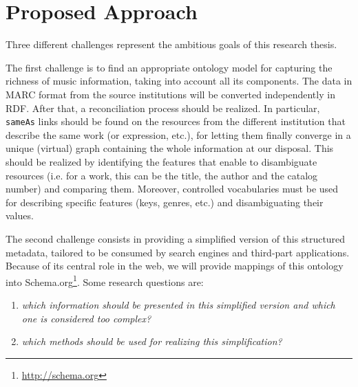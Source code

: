 \documentclass{llncs}
\begin{document}
\section{Proposed Approach}
\label{sec:approach}
Three different challenges represent the ambitious goals of this research thesis.

The first challenge is to find an appropriate ontology model for capturing the richness of music information, taking into account all its components. The data in MARC format from the source institutions will be converted independently in RDF. After that, a reconciliation process should be realized. In particular, \texttt{sameAs} links should be found on the resources from the different institution that describe the same work (or expression, etc.), for letting them finally converge in a unique (virtual) graph containing the whole information at our disposal. This should be realized by identifying the features that enable to disambiguate resources (i.e. for a work, this can be the title, the author and the catalog number) and comparing them. Moreover, controlled vocabularies must be used for describing specific features (keys, genres, etc.) and disambiguating their values.

The second challenge consists in providing a simplified version of this structured metadata, tailored to be consumed by search engines and third-part applications. Because of its central role in the web, we will provide mappings of this ontology into Schema.org\footnote{\url{http://schema.org}}. Some research questions are:
\begin{enumerate}
 \item \textit{which information should be presented in this simplified version and which one is considered too complex?}
 \item \textit{which methods should be used for realizing this simplification?}
\end{enumerate}
\end{document}
